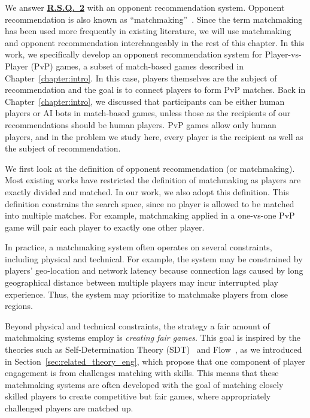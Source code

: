We answer \hyperref[rq2]{\textbf{R.S.Q.~2}} with an opponent recommendation system. Opponent recommendation is also known as ``matchmaking''~\citep{medler2011using}. Since the term matchmaking has been used more frequently in existing literature, we will use matchmaking and opponent recommendation interchangeably in the rest of this chapter. In this work, we specifically develop an opponent recommendation system for Player-vs-Player (PvP) games, a subset of match-based games described in Chapter~\ref{chapter:intro}. In this case, players themselves are the subject of recommendation and the goal is to connect players to form  PvP matches. Back in Chapter~\ref{chapter:intro}, we discussed that participants can be either human players or AI bots in match-based games, unless those as the recipients of our recommendations should be human players. PvP games allow only human players, and in the  problem we study here, every player is the recipient as well as the subject of recommendation. 

We first look at the definition of opponent recommendation (or matchmaking). Most existing works have restricted the definition of matchmaking as players are exactly divided and matched. In our work, we also adopt this definition. This definition constrains the search space, since no player is allowed to be matched into multiple matches. For example, matchmaking applied in a one-vs-one PvP game will pair each player to exactly one other player. 


In practice, a matchmaking system often operates on several constraints, including physical and technical. For example, the system may be constrained by players' geo-location and network latency because connection lags caused by long geographical distance between multiple players may incur interrupted play experience. Thus, the system may prioritize to matchmake players from close regions.

Beyond physical and technical constraints, the strategy a fair amount of matchmaking systems employ is \emph{creating fair games}. This goal is inspired by the theories such as Self-Determination Theory (SDT)~\citep{ryan2000self} and Flow~\citep{flow1990psychology}, as we introduced in Section~\ref{sec:related_theory_eng}, which propose that one component of player engagement is from challenges matching with skills. This means that these matchmaking systems are often developed with the goal of matching closely skilled players to create competitive but fair games, where appropriately challenged players are matched up. 

